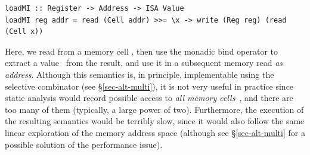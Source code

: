 \vspace{1mm}
\begin{verbatim}
loadMI :: Register -> Address -> ISA Value
loadMI reg addr = read (Cell addr) >>= \x -> write (Reg reg) (read (Cell x))
\end{verbatim}
\vspace{1mm}

\noindent
Here, we read from a memory cell , then use the monadic bind operator
to extract a value~ from the result, and use it in a subsequent memory
read \emph{as address}. Although this semantics is, in principle, implementable
using the selective  combinator (see \S\ref{sec-alt-multi}), it is not
very useful in practice since static analysis would record possible access to
\emph{all memory cells}~, and there are too many of them (typically, a
large power of two). Furthermore, the execution of the resulting semantics would
be terribly slow, since it would also follow the same linear exploration of the
memory address space (although see \S\ref{sec-alt-multi} for a possible solution
of the performance issue).

